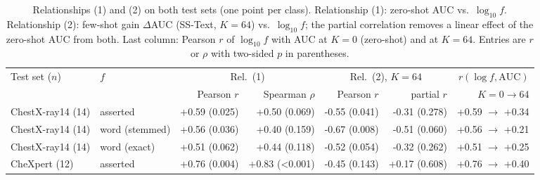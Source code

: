 \begin{table}[!t]
\centering
\footnotesize
\caption{Relationships (1) and (2) on both test sets (one point per class). Relationship (1): zero-shot AUC vs.\
$\log_{10} f$. Relationship (2): few-shot gain $\Delta$AUC (SS-Text, $K=64$) vs.\ $\log_{10} f$; the partial
correlation removes a linear effect of the zero-shot AUC from both. Last column: Pearson $r$ of $\log_{10} f$ with
AUC at $K=0$ (zero-shot) and at $K=64$. Entries are $r$ or $\rho$ with two-sided $p$ in parentheses.}
\label{tab:rel}
\begin{tabular}{llrrrrr}
\toprule
Test set ($n$) & $f$ & \multicolumn{2}{c}{Rel.~(1)} & \multicolumn{2}{c}{Rel.~(2), $K=64$} & $r(\log f,\mathrm{AUC})$ \\
 & & Pearson $r$ & Spearman $\rho$ & Pearson $r$ & partial $r$ & $K{=}0 \to 64$ \\
\midrule
ChestX-ray14 (14) & asserted & +0.59 (0.025) & +0.50 (0.069) & -0.55 (0.041) & -0.31 (0.278) & +0.59 $\to$ +0.34 \\
ChestX-ray14 (14) & word (stemmed) & +0.56 (0.036) & +0.40 (0.159) & -0.67 (0.008) & -0.51 (0.060) & +0.56 $\to$ +0.21 \\
ChestX-ray14 (14) & word (exact) & +0.51 (0.062) & +0.44 (0.118) & -0.52 (0.054) & -0.32 (0.262) & +0.51 $\to$ +0.25 \\
CheXpert (12) & asserted & +0.76 (0.004) & +0.83 (<0.001) & -0.45 (0.143) & +0.17 (0.608) & +0.76 $\to$ +0.40 \\
\bottomrule
\end{tabular}
\end{table}
